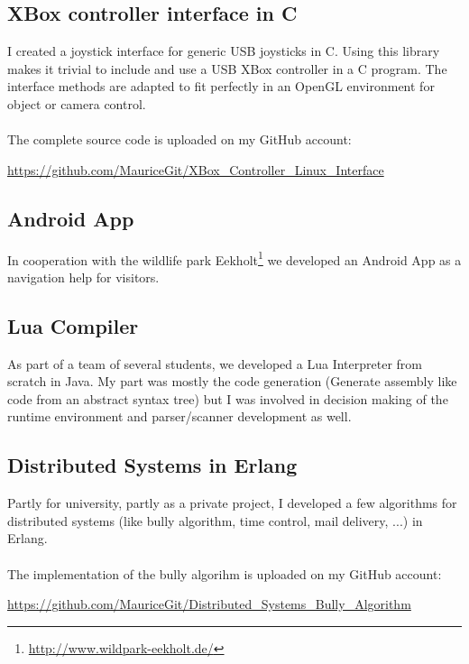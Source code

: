\documentclass[a4paper, 12pt]{article}
\begin{document}
\subsection{XBox controller interface in C}

I created a joystick interface for generic USB joysticks in C.
Using this library makes it trivial to include and use a USB XBox controller in a C program. The interface methods are adapted to fit perfectly in an OpenGL environment for object or camera control.
\\
\\
The complete source code is uploaded on my GitHub account:

\begin{center}
	\url{https://github.com/MauriceGit/XBox_Controller_Linux_Interface}
\end{center}

\subsection{Android App}

In cooperation with the wildlife park Eekholt\footnote{\url{http://www.wildpark-eekholt.de/}} we developed an Android 
App as a navigation help for visitors. 

\subsection{Lua Compiler}

As part of a team of several students, we developed a Lua Interpreter from scratch in Java. My part was mostly the 
code generation (Generate assembly like code from an abstract syntax tree) but I was involved in decision making
of the runtime environment and parser/scanner development as well. 

\subsection{Distributed Systems in Erlang}
 
Partly for university, partly as a private project, I developed a few algorithms for distributed systems (like 
bully algorithm, time control, mail delivery, ...) in Erlang.
\\
\\
The implementation of the bully algorihm is uploaded on my GitHub account:
\begin{center}
	\url{https://github.com/MauriceGit/Distributed_Systems_Bully_Algorithm}
\end{center}

 
\end{document}

